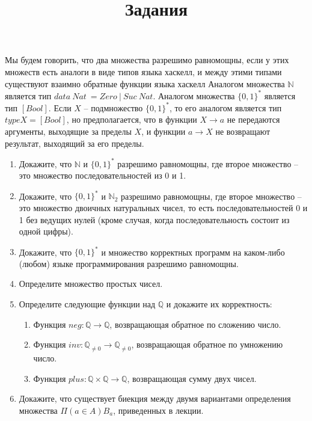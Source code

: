 \documentclass[draft]{article}
\begin{document}
\title{Задания}
\maketitle

Мы будем говорить, что два множества разрешимо равномощны, если у этих множеств есть аналоги в виде типов языка хаскелл,
    и между этими типами существуют взаимно обратные функции языка хаскелл
Аналогом множества $\mathbb{N}$ является тип $data\ Nat\ = Zero\ |\ Suc\ Nat$.
Аналогом множества $\{0,1\}^*$ является тип $[Bool]$.
Если $X$ -- подмножество $\{0,1\}^*$, то его аналогом является тип $type X = [Bool]$, но предполагается,
    что в функции $X \to a$ не передаются аргументы, выходящие за пределы $X$, и функции $a \to X$ не возвращают результат, выходящий за его пределы.

\begin{enumerate}

\item Докажите, что $\mathbb{N}$ и $\{0,1\}^*$ разрешимо равномощны, где второе множество -- это множество последовательностей из 0 и 1.

\item Докажите, что $\{0,1\}^*$ и $\mathbb{N}_2$ разрешимо равномощны, где второе множество -- это множество двоичных натуральных чисел,
    то есть последовательностей 0 и 1 без ведущих нулей (кроме случая, когда последовательность состоит из одной цифры).

\item Докажите, что $\{0,1\}^*$ и множество корректных программ на каком-либо (любом) языке программирования разрешимо равномощны.

\item Определите множество простых чисел.

\item Определите следующие функции над $\mathbb{Q}$ и докажите их корректность:
\begin{enumerate}
\item Функция $neg : \mathbb{Q} \to \mathbb{Q}$, возвращающая обратное по сложению число.
\item Функция $inv : \mathbb{Q}_{\neq 0} \to \mathbb{Q}_{\neq 0}$, возвращающая обратное по умножению число.
\item Функция $plus : \mathbb{Q} \times \mathbb{Q} \to \mathbb{Q}$, возвращающая сумму двух чисел.
\end{enumerate}

\item Докажите, что существует биекция между двумя вариантами определения множества $\Pi (a \in A) B_a$, приведенных в лекции.


\end{enumerate}
\end{document}
